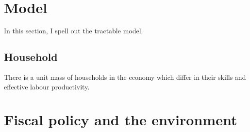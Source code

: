 \section{Model}

In this section, I spell out the tractable model. 
\subsection{Household}
There is a unit mass of households in the economy which differ in their skills and effective labour productivity. 


\section{Fiscal policy and the environment}
